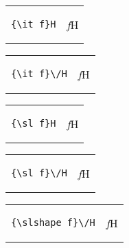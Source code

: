 \documentclass{article}
\begin{document}
\Huge



\begin{tabular}[]{p{5cm}l}
\begin{minipage}{1cm}
\begin{verbatim}
{\it f}H
\end{verbatim}  
\end{minipage}
& 
\begin{minipage}{1cm}
{\it f}H
\end{minipage}
\end{tabular}

\begin{tabular}[]{p{5cm}l}
\begin{minipage}{1cm}
\begin{verbatim}
{\it f}\/H
\end{verbatim}  
\end{minipage}
& 
\begin{minipage}{1cm}
{\it f}\/H
\end{minipage}
\end{tabular}



\begin{tabular}[]{p{5cm}l}
\begin{minipage}{1cm}
\begin{verbatim}
{\sl f}H
\end{verbatim}  
\end{minipage}
& 
\begin{minipage}{1cm}
{\sl f}H
\end{minipage}
\end{tabular}

\begin{tabular}[]{p{5cm}l}
\begin{minipage}{1cm}
\begin{verbatim}
{\sl f}\/H
\end{verbatim}  
\end{minipage}
& 
\begin{minipage}{1cm}
{\sl f}\/H
\end{minipage}
\end{tabular}


\begin{tabular}[]{p{5cm}l}
\begin{minipage}{1cm}
\begin{verbatim}
{\slshape f}\/H
\end{verbatim}  
\end{minipage}
& 
\begin{minipage}{1cm}
{\slshape f}\/H
\end{minipage}
\end{tabular}
\end{document}
